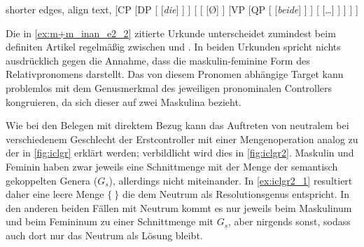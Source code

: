 \begin{exe}
\ex \label{ex:dibeidecstruct}
	\begin{forest} shorter edges, align text,
	[CP
		[DP
			[
				[\textit{die}]
			]
		]
		[
			[
				[Ø]
			]
			[VP
				[QP
					[
						[\textit{beide}]
					]
				]
				[
					[\dots]
				]
			]
		]
	]
	\end{forest}
\end{exe}

Die in \cref{ex:m+m_inan_e2_2} zitierte Urkunde unterscheidet zumindest beim
definiten Artikel regelmäßig zwischen  und . In beiden
Urkunden spricht nichts ausdrücklich gegen die Annahme, dass  die maskulin-feminine Form des Relativpronomens darstellt. Das
von diesem Pronomen abhängige Target  kann problemlos mit dem
Genusmerkmal des jeweiligen pronominalen Controllers kongruieren, da sich
dieser auf zwei Maskulina bezieht.

Wie bei den Belegen mit direktem Bezug kann das Auftreten von neutralem
 bei verschiedenem Geschlecht der Erstcontroller mit einer
Mengenoperation analog zu der in \cref{fig:iclgr} erklärt werden; verbildlicht
wird dies in \cref{fig:iclgr2}. Maskulin und Feminin haben zwar jeweils eine
Schnittmenge mit der Menge der semantisch gekoppelten Genera ($G_s$),
allerdings nicht miteinander. In \cref{ex:iclgr2_1} resultiert daher eine leere
Menge $\{\ \}$ die dem Neutrum als Resolutionsgenus entspricht. In den anderen
beiden Fällen mit Neutrum  kommt es nur
jeweils beim Maskulinum und beim Femininum zu einer Schnittmenge mit $G_s$,
aber nirgends sonst, sodass auch dort nur das Neutrum als Lösung bleibt.


